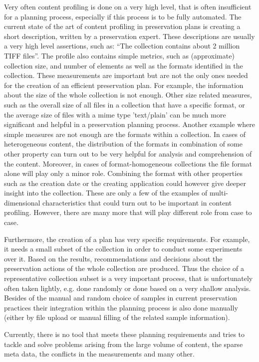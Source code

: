 Very often content profiling is done on a very high level, that is often insufficient for a planning process, especially if this process is to be fully automated.
The current state of the art of content profiling in preservation plans is creating a short description, written by a preservation expert.
These descriptions are usually a very high level assertions, such as: ``The collection contains about 2 million TIFF files''. 
The profile also contains simple metrics, such as (approximate) collection size, and number of elements as well as the formats identified in the collection. 
These measurements are important but are not the only ones needed for the creation of an efficient preservation plan.
For example, the information about the size of the whole collection is not enough.
Other size related measures, such as the overall size of all files in a collection that have a specific format, or the average size of files with a mime type 'text/plain' can be much more significant and helpful in a preservation planning process.
Another example where simple measures are not enough are the formats within a collection.
In cases of heterogeneous content, the distribution of the formats in combination of some other property can turn out to be very helpful for analysis and comprehension of the content.
Moreover, in cases of format-homogeneous collections the file format alone will play only a minor role.
Combining the format with other properties such as the creation date or the creating application could however give deeper insight into the collection.
These are only a few of the examples of multi-dimensional characteristics that could turn out to be important in content profiling.
However, there are many more that will play different role from case to case.

Furthermore, the creation of a plan has very specific requirements.
For example, it needs a small subset of the collection in order to conduct some experiments over it.
Based on the results, recommendations and decisions about the preservation actions of the whole collection are produced.
Thus the choice of a representative collection subset is a very important process, that is unfortunately often taken lightly, e.g. done randomly or done based on a very shallow analysis.
Besides of the manual and random choice of samples in current preservation practices their integration within the planning process is also done manually (either by file upload or manual filling of the related sample information).

Currently, there is no tool that meets these planning requirements and tries to tackle and solve problems arising from the large volume of content, the sparse meta data, the conflicts in the measurements and many other.

